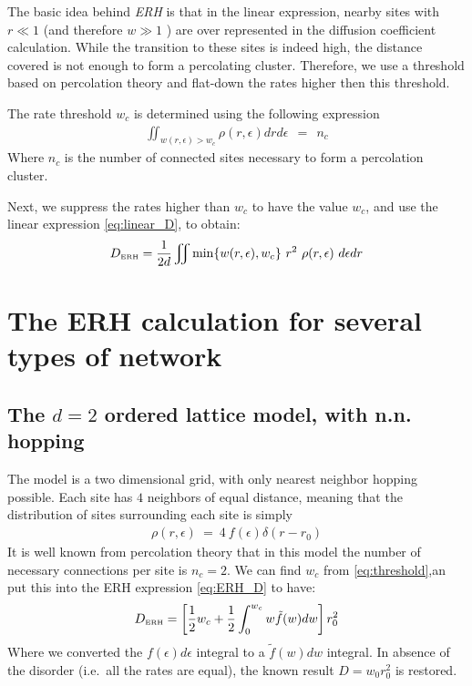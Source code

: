 The basic idea behind \emph{ERH} is that in the linear
expression, nearby sites 
with $r\ll 1$ (and therefore $w \gg 1$ ) are over represented in
the diffusion coefficient calculation. While the transition to
these sites is indeed high, the distance covered is not enough
to form a percolating cluster. Therefore, we use a threshold based
on percolation theory and flat-down the rates higher then this threshold.

The rate threshold $w_c$ is determined using the following expression
%
\begin{align}\label{eq:threshold}
\iint_{w(r,\epsilon)>w_c} \rho(r,\epsilon)drd\epsilon \ \ = \ \ n_c
\end{align}
%
Where $n_c$ is the number of connected sites necessary to form a percolation
cluster.


Next, we suppress the rates higher than $w_c$ to have the value $w_c$,
and use the linear expression \ref{eq:linear_D}, to obtain:
%
\begin{align}\label{eq:ERH_D}
D_{\tbox{ERH}} = \frac{1}{2d}\iint \min\{w(r,\epsilon),w_c\} \ r^2  \ \rho(r,\epsilon) \ d\epsilon dr
\end{align}
%


\section{The ERH calculation for several types of network}
\subsection{The $d=2$ ordered lattice model, with n.n. hopping}

The model is a  two dimensional grid, with only nearest neighbor hopping possible. 
Each site has $4$ neighbors of equal distance, meaning that
the distribution of sites surrounding each site is simply
%
\begin{align}
\rho(r,\epsilon) \ = \ 4\ f(\epsilon)\delta(r-r_0) 
\end{align}
%
It is well known from percolation theory \cite{stauffer_introduction_1994}
that in this model the number of necessary connections per site is $n_c=2$. We can
find $w_c$ from \ref{eq:threshold},an put this into the ERH 
expression \ref{eq:ERH_D} to have:
%
\begin{align}
D_{\mbox{\tiny ERH}} =  \left[\frac{1}{2}w_c + \frac{1}{2}\int_0^{w_c} w\tilde{f}(w) dw\right]r_0^2
\end{align}
%
Where we converted the $f(\epsilon)d\epsilon$ integral to a $\tilde{f}(w)dw$
integral. In absence of the disorder (i.e.\ all the rates are equal),
the known result $D = w_0r_0^2$ is restored.


